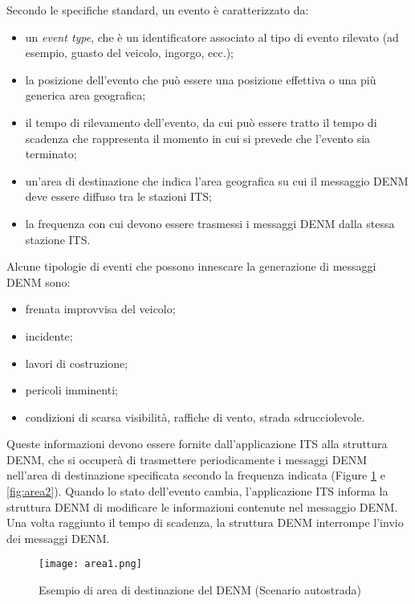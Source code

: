 Secondo le specifiche standard, un evento è caratterizzato da:
\begin{itemize}
    \item un \textit{event type}, che è un identificatore associato al tipo di evento rilevato (ad esempio, guasto del veicolo, ingorgo, ecc.); 
    \item la posizione dell'evento che può essere una posizione effettiva o una più generica area geografica; 
    \item il tempo di rilevamento dell'evento, da cui può essere tratto il tempo di scadenza che rappresenta il momento in cui si prevede che l'evento sia terminato;
    \item un'area di destinazione che indica l'area geografica su cui il messaggio DENM deve essere diffuso tra le stazioni ITS;
    \item la frequenza con cui devono essere trasmessi i messaggi DENM dalla stessa stazione ITS.
\end{itemize}

Alcune tipologie di eventi che possono innescare la generazione di messaggi DENM sono:

\begin{itemize}
    \item frenata improvvisa del veicolo;
    \item incidente;
    \item lavori di costruzione;
    \item pericoli imminenti;
    \item condizioni di scarsa visibilità, raffiche di vento, strada sdrucciolevole.
\end{itemize}

Queste informazioni devono essere fornite dall'applicazione ITS alla struttura DENM, che si occuperà di trasmettere periodicamente i messaggi DENM nell'area di destinazione specificata secondo la frequenza indicata (Figure \ref{fig:area1} e \ref{fig:area2}). Quando lo stato dell'evento cambia, l'applicazione ITS informa la struttura DENM di modificare le informazioni contenute nel messaggio DENM. Una volta raggiunto il tempo di scadenza, la struttura DENM interrompe l'invio dei messaggi DENM. 

\begin{figure}[h!]
    \centering
    \texttt{[image: area1.png]}
    \caption{Esempio di area di destinazione del DENM (Scenario autostrada)}
    \label{fig:area1}
\end{figure}

